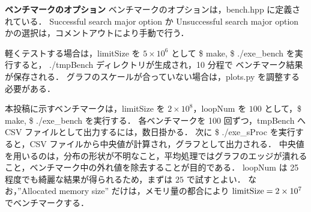 {\bf ベンチマークのオプション}
\samepage\newline\indent
ベンチマークのオプションは，bench.hpp に定義されている．
Successful search major option か Unsuccessful search major option かの選択は，コメントアウトにより手動で行う．

軽くテストする場合は，limitSize を $5\times 10^6$ として \$ make, \$ ./exe\_bench を実行すると，
./tmpBench ディレクトリが生成され，10 分程で ベンチマーク結果が保存される．
グラフのスケールが合っていない場合は，plots.py を調整する必要がある．

本投稿に示すベンチマークは，limitSize を $2\times10^8$，loopNum を $100$ として，\$ make, \$ ./exe\_bench を実行する．
各ベンチマークを 100 回ずつ，tmpBench へ CSV ファイルとして出力するには，数日掛かる．
次に \$ ./exe\_sProc を実行すると，CSV ファイルから中央値が計算され，グラフとして出力される．
中央値を用いるのは，分布の形状が不明なこと，平均処理ではグラフのエッジが潰れること，ベンチマーク中の外れ値を除去することが目的である．
loopNum は 25 程度でも綺麗な結果が得られるため，まずは $25$ で試すとよい．
なお，''Allocated memory size'' だけは，メモリ量の都合により ${\rm limitSize}=2\times10^7$ でベンチマークする．





